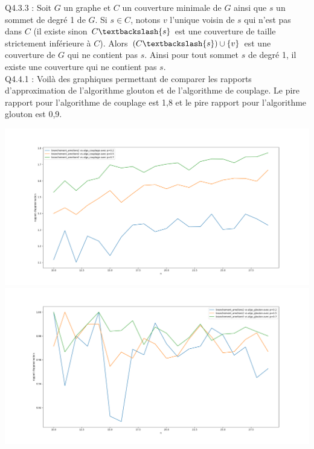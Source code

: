 \documentclass[a4paper]{article}
\begin{document}
Q4.3.3 :
Soit $G$ un graphe et $C$ un couverture minimale de $G$ ainsi que $s$ un sommet de degré 1 de $G$. Si $s \in C$, notons $v$ l'unique voisin de $s$ qui n'est pas dans $C$ (il existe sinon $C\textbackslash\{s\}$ est une couverture de taille strictement inférieure à $C$). Alors $(C\textbackslash\{s\}) \cup \{v\}$ est une couverture de $G$ qui ne contient pas $s$. Ainsi pour tout sommet $s$ de degré 1, il existe une couverture qui ne contient pas $s$. \\

Q4.4.1 : 
Voilà des graphiques permettant de comparer les rapports d'approximation de l'algorithme glouton et de l'algorithme de couplage. Le pire rapport pour l'algorithme de couplage est 1,8 et le pire rapport pour l'algorithme glouton est 0,9.

\includegraphics[scale=0.3]{"./rapport_approx_couplage.png"}
\includegraphics[scale=0.3]{"./rapport_approx_glouton.png"}
\end{document}
